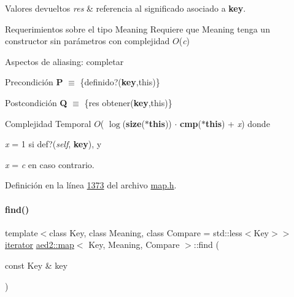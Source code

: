 \begin{DoxyRetVals}{Valores devueltos}
{\em res} & referencia al significado asociado a {\bfseries key}.\\
\hline
\end{DoxyRetVals}
\begin{DoxyParagraph}{Requerimientos sobre el tipo Meaning}
Requiere que Meaning tenga un constructor sin parámetros con complejidad $O$({\itshape c})
\end{DoxyParagraph}
\begin{DoxyParagraph}{Aspectos de aliasing\+:}
completar
\end{DoxyParagraph}
\begin{DoxyPrecond}{Precondición}
{\bfseries P} $\equiv$ \{definido?({\bfseries key},this)\} 
\end{DoxyPrecond}
\begin{DoxyPostcond}{Postcondición}
{\bfseries Q} $\equiv$ \{res  obtener({\bfseries key},this)\}
\end{DoxyPostcond}

\begin{DoxyDescription}
\item[Complejidad Temporal]$O$( $\log$({\bfseries size}({\bfseries $\ast$this})) $\cdot$ {\bfseries cmp}({\bfseries $\ast$this}) + {\itshape x}) donde
\begin{DoxyItemize}
\item {\itshape x} = 1 si def?({\itshape self}, {\bfseries key}), y
\item {\itshape x} = {\itshape c} en caso contrario.
\end{DoxyItemize}
\end{DoxyDescription}

Definición en la línea \hyperlink{map_8h_source_l01373}{1373} del archivo \hyperlink{map_8h_source}{map.\+h}.

\mbox{\label{classaed2_1_1map_afd0fc1a8234888e61e0e615de7e245b8_afd0fc1a8234888e61e0e615de7e245b8}} 
\paragraph{\texorpdfstring{find()}{find()}\hspace{0.1cm}{\footnotesize\ttfamily [1/2]}}
{\footnotesize\ttfamily template$<$class Key, class Meaning, class Compare = std\+::less$<$\+Key$>$$>$ \\
\hyperlink{classaed2_1_1map_1_1iterator}{iterator} \hyperlink{classaed2_1_1map}{aed2\+::map}$<$ Key, Meaning, Compare $>$\+::find (\begin{DoxyParamCaption}\item[{const Key \&}]{key }\end{DoxyParamCaption})\hspace{0.3cm}{\ttfamily [inline]}}



